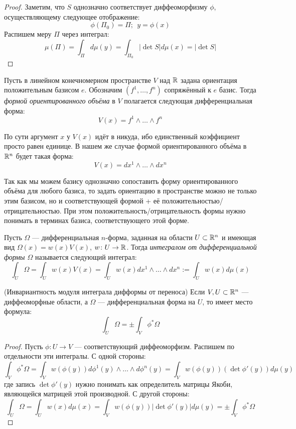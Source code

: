 \begin{proof}
	Заметим, что $S$ однозначно соответствует диффеоморфизму $\phi$, осуществляющему следующее отображение:
	\[
		\phi(\Pi_0) = \Pi;\ \ y = \phi(x)
	\]
	Распишем меру $\Pi$ через интеграл:
	\[
		\mu(\Pi) = \int_\Pi d\mu(y) = \int_{\Pi_0} |\det S| d\mu(x) = |\det S|
	\]
\end{proof}

\begin{definition}
	Пусть в линейном конечномерном пространстве $V$ над $\mathbb{R}$ задана ориентация положительным базисом $e$. Обозначим $(f^1, \ldots, f^n)$ сопряжённый к $e$ базис. Тогда \textit{формой ориентированного объёма} в $V$ полагается следующая дифференциальная форма:
	\[
		V(x) = f^1 \wedge \ldots \wedge f^n
	\]
\end{definition}

\begin{anote}
	По сути аргумент $x$ у $V(x)$ идёт в никуда, ибо единственный коэффициент просто равен единице. В нашем же случае формой ориентированного объёма в $\mathbb{R}^n$ будет такая форма:
	\[
		V(x) = dx^1 \wedge \ldots \wedge dx^n
	\]
\end{anote}

\begin{anote}
	Так как мы можем базису однозначно сопоставить форму ориентированного объёма для любого базиса, то задать ориентацию в пространстве можно не только этим базисом, но и соответствующей формой + её положительностью/отрицательностью. При этом положительность/отрицательность формы нужно понимать в терминах базиса, соответствующего этой форме.
\end{anote}

\begin{definition}
	Пусть $\Omega$ --- дифференциальная $n$-форма, заданная на области $U \subset \mathbb{R}^n$ и имеющая вид $\Omega(x) = w(x)V(x)$, $w \colon U \to \mathbb{R}$. Тогда \textit{интегралом от дифференциальной формы $\Omega$} называется следующий интеграл:
	\[
		\int_U \Omega = \int_U w(x)V(x) = \int_U w(x)dx^1 \wedge \ldots \wedge dx^n := \int_U w(x)d\mu(x)
	\]
\end{definition}

\begin{proposition} (Инвариантность модуля интеграла дифформы от переноса)
	Если $V, U \subset \mathbb{R}^n$ --- диффеоморфные области, а $\Omega$ --- дифференциальная форма на $U$, то имеет место формула:
	\[
		\int_U \Omega = \pm\int_V \phi^*\Omega
	\]
\end{proposition}

\begin{proof}
	Пусть $\phi \colon U \to V$ --- соответствующий диффеоморфизм. Распишем по отдельности эти интегралы. С одной стороны:
	\[
		\int_V \phi^*\Omega = \int_V w(\phi(y))d\phi^1(y) \wedge \ldots \wedge d\phi^n(y) = \int_V w(\phi(y))(\det \phi'(y))d\mu(y)
	\]
	где запись $\det \phi'(y)$ нужно понимать как определитель матрицы Якоби, являющейся матрицей этой производной. С другой стороны:
	\[
		\int_U \Omega = \int_U w(x)d\mu(x) = \int_V w(\phi(y)) |\det \phi'(y)|d\mu(y) = \pm \int_V \phi^*\Omega
	\]
\end{proof}